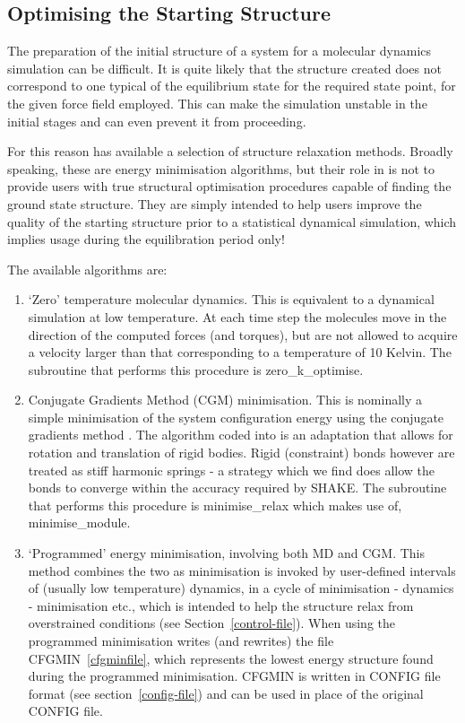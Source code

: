 \subsection{Optimising the Starting Structure} \label{minimisation} 

The preparation of the initial structure of a system for a molecular
dynamics simulation can be difficult.  It is quite likely that the
structure created does not correspond to one typical of the
equilibrium state for the required state point, for the given force
field employed.  This can make the simulation unstable in the initial
stages and can even prevent it from proceeding.

For this reason \D has available a selection of structure relaxation
methods.  Broadly speaking, these are energy minimisation algorithms,
but their role in \D is not to provide users with true structural
optimisation procedures capable of finding the ground state structure.
They are simply intended to help users improve the quality of the
starting structure prior to a statistical dynamical simulation, which
implies usage during the equilibration period only!

The available algorithms are:
\begin{enumerate}
\item `Zero' temperature molecular dynamics.
This is equivalent to a dynamical simulation at low temperature.
At each time step the molecules move in the direction of the
computed forces (and torques), but are not allowed to acquire
a velocity larger than that corresponding to a temperature of 10 Kelvin.
The subroutine that performs this procedure is {\sc zero\_k\_optimise}.

\item Conjugate Gradients Method (CGM) minimisation.
This is nominally a simple minimisation of the system configuration
energy using the conjugate gradients method \cite{shewchuk-94a}.
The algorithm coded into \D is an adaptation that allows for
rotation and translation of rigid bodies. Rigid (constraint) bonds
however are treated as stiff harmonic springs - a strategy which
we find does allow the bonds to converge within the accuracy
required by SHAKE.  The subroutine that performs this procedure
is {\sc minimise\_relax} which makes use of, {\sc minimise\_module}.

\item `Programmed' energy minimisation, involving both MD and CGM.
This method combines the two as minimisation is invoked by
user-defined intervals of (usually low temperature) dynamics, in a
cycle of minimisation - dynamics - minimisation etc., which is
intended to help the structure relax from overstrained conditions
(see Section~\ref{control-file}).  When using the programmed
minimisation \D writes (and rewrites) the file CFGMIN~\ref{cfgminfile},
which represents the lowest energy structure found during the
programmed minimisation.  CFGMIN is written in CONFIG file format
(see section~\ref{config-file}) and can be used in place of the
original CONFIG file.
\end{enumerate}

